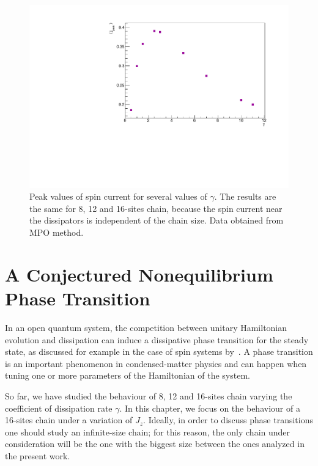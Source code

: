 \begin{figure}[H]
    \centering
    \includegraphics[scale=0.7]{Figures/PeakValueSpinCurrVSgamma_8sites.pdf}
    \captionsetup{width=1.\linewidth}
    \caption{Peak values of spin current for several values of $\gamma$. The results are the same for 8, 12 and 16-sites chain, because the spin current near the dissipators is independent of the chain size. Data obtained from MPO method.}
    \label{fig:PeakValueSpinCurrVSgamma_8sites}
\end{figure}


\section{A Conjectured Nonequilibrium Phase Transition}
\label{chapt4_phase_trans}

In an open quantum system, the competition between unitary Hamiltonian evolution and dissipation can induce a dissipative phase transition for the steady state, as discussed for example in the case of spin systems by~\cite{phase_trans_spin_system}.
A phase transition is an important phenomenon in condensed-matter physics and can happen when tuning one or more parameters of the Hamiltonian of the system. 

So far, we have studied the behaviour of 8, 12 and 16-sites chain varying the coefficient of dissipation rate $\gamma$. In this chapter, we focus on the behaviour of a 16-sites chain under a variation of $J_z$. Ideally, in order to discuss phase transitions one should study an infinite-size chain; for this reason, the only chain under consideration will be the one with the biggest size between the ones analyzed in the present work.

